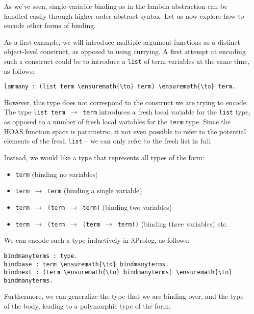As we've seen, single-variable binding as in the lambda abstraction can
be handled easily through higher-order abstract syntax. Let us now
explore how to encode other forms of binding.

As a first example, we will introduce multiple-argument functions as a
distinct object-level construct, as opposed to using currying. A first
attempt at encoding such a construct could be to introduce a
\texttt{list} of term variables at the same time, as follows:

\begin{verbatim}
lammany : (list term \ensuremath{\to} term) \ensuremath{\to} term.
\end{verbatim}

However, this type does not correspond to the construct we are trying to
encode. The type \texttt{list\ term\ \ensuremath{\to}\ term} introduces a
fresh local variable for the \texttt{list} type, as opposed to a number
of fresh local variables for the \texttt{term} type. Since the HOAS
function space is parametric, it not even possible to refer to the
potential elements of the fresh \texttt{list} -- we can only refer to
the fresh list in full.

Instead, we would like a type that represents all types of the form:

\begin{itemize}
\tightlist
\item
  \texttt{term} (binding no variables)
\item
  \texttt{term\ \ensuremath{\to}\ term} (binding a single variable)
\item
  \texttt{term\ \ensuremath{\to}\ (term\ \ensuremath{\to}\ term)} (binding
  two variables)
\item
  \texttt{term\ \ensuremath{\to}\ (term\ \ensuremath{\to}\ (term\ \ensuremath{\to}\ term))}
  (binding three variables) etc.
\end{itemize}

We can encode such a type inductively in \ensuremath{\lambda}Prolog, as follows:

\begin{verbatim}
bindmanyterms : type.
bindbase : term \ensuremath{\to} bindmanyterms.
bindnext : (term \ensuremath{\to} bindmanyterms) \ensuremath{\to} bindmanyterms.
\end{verbatim}

Furthermore, we can generalize the type that we are binding over, and
the type of the body, leading to a polymorphic type of the form:

